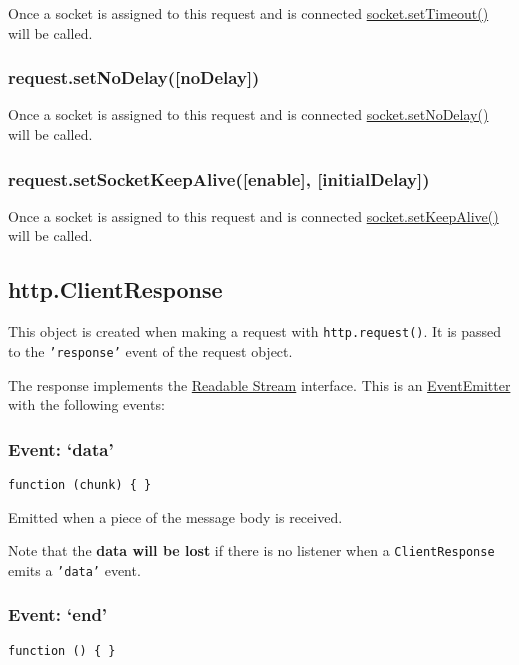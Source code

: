 Once a socket is assigned to this request and is connected
\href{net.html\#net\_socket\_settimeout\_timeout\_callback}{socket.setTimeout()}
will be called.

\subsubsection{request.setNoDelay({[}noDelay{]})}

Once a socket is assigned to this request and is connected
\href{net.html\#net\_socket\_setnodelay\_nodelay}{socket.setNoDelay()}
will be called.

\subsubsection{request.setSocketKeepAlive({[}enable{]},
{[}initialDelay{]})}

Once a socket is assigned to this request and is connected
\href{net.html\#net\_socket\_setkeepalive\_enable\_initialdelay}{socket.setKeepAlive()}
will be called.

\subsection{http.ClientResponse}

This object is created when making a request with
\texttt{http.request()}. It is passed to the \texttt{'response'} event
of the request object.

The response implements the
\href{stream.html\#stream\_readable\_stream}{Readable Stream} interface.
This is an
\href{events.html\#events\_class\_events\_eventemitter}{EventEmitter}
with the following events:

\subsubsection{Event: `data'}

\texttt{function (chunk) \{ \}}

Emitted when a piece of the message body is received.

Note that the \textbf{data will be lost} if there is no listener when a
\texttt{ClientResponse} emits a \texttt{'data'} event.

\subsubsection{Event: `end'}

\texttt{function () \{ \}}

